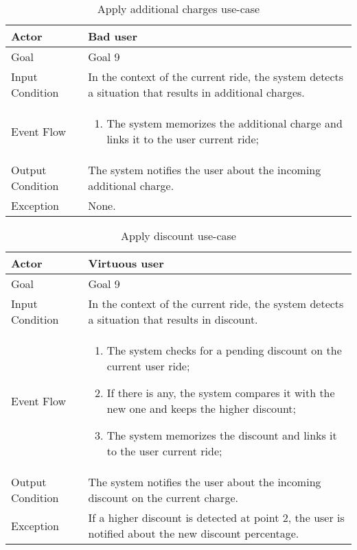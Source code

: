 \begin{table}[H]
\begin{center}
\begin{tabular}{p{} | p{}}
\hline
Actor & Bad user\\
\hline
Goal & Goal 9\\
\hline
Input Condition & In the context of the current ride, the system detects a situation that results in additional charges.\\
\hline
Event Flow & 
\begin{enumerate}
\item The system memorizes the additional charge and links it to the user current ride;
\end{enumerate} \\
\hline
Output Condition & The system notifies the user about the incoming additional charge.\\
\hline
Exception & None.\\
\hline
\end{tabular}
\end{center}
\caption{Apply additional charges use-case}
\label{apply_additional_charges_uc}
\end{table}

\begin{table}[H]
\begin{center}
\begin{tabular}{p{} | p{}}
\hline
Actor & Virtuous user\\
\hline
Goal & Goal 9\\
\hline
Input Condition & In the context of the current ride, the system detects a situation that results in discount.\\
\hline
Event Flow & 
\begin{enumerate}
\item The system checks for a pending discount on the current user ride;
\item If there is any, the system compares it with the new one and keeps the higher discount;
\item The system memorizes the discount and links it to the user current ride;
\end{enumerate} \\
\hline
Output Condition & The system notifies the user about the incoming discount on the current charge.\\
\hline
Exception & If a higher discount is detected at point 2, the user is notified about the new discount percentage.\\
\hline
\end{tabular}
\end{center}
\caption{Apply discount use-case}
\label{apply_discounts_uc}
\end{table}